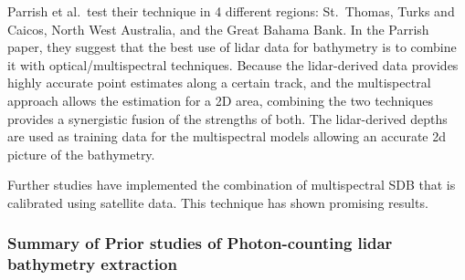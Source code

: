 Parrish et al.~test their technique in 4 different regions: St.~Thomas,
Turks and Caicos, North West Australia, and the Great Bahama Bank. In
the Parrish paper, they suggest that the best use of lidar data for
bathymetry is to combine it with optical/multispectral techniques.
Because the lidar-derived data provides highly accurate point estimates
along a certain track, and the multispectral approach allows the
estimation for a 2D area, combining the two techniques provides a
synergistic fusion of the strengths of both. The lidar-derived depths
are used as training data for the multispectral models allowing an
accurate 2d picture of the bathymetry.

Further studies have implemented the combination of multispectral SDB
that is calibrated using satellite data. This technique has shown
promising results.

\hypertarget{summary-of-prior-studies-of-photon-counting-lidar-bathymetry-extraction}{%
  \subsubsection{Summary of Prior studies of Photon-counting lidar
    bathymetry
    extraction}\label{summary-of-prior-studies-of-photon-counting-lidar-bathymetry-extraction}}

